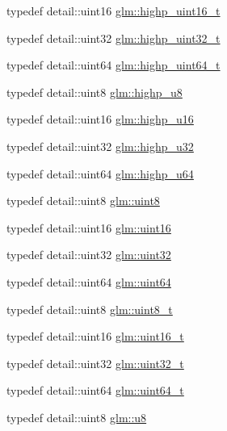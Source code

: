 \begin{DoxyCompactItemize}
\item 
typedef detail\-::uint16 \hyperlink{group__gtc__type__precision_ga3145bc0ee80432c165e985a188a722b3}{glm\-::highp\-\_\-uint16\-\_\-t}
\item 
typedef detail\-::uint32 \hyperlink{group__gtc__type__precision_ga8eb85ad460079c63b68866ae34637bda}{glm\-::highp\-\_\-uint32\-\_\-t}
\item 
typedef detail\-::uint64 \hyperlink{group__gtc__type__precision_ga6e66f40c5909bfc872b068187fa6029e}{glm\-::highp\-\_\-uint64\-\_\-t}
\item 
typedef detail\-::uint8 \hyperlink{group__gtc__type__precision_ga8a60abe782749c504fb5ae51eb8b49cc}{glm\-::highp\-\_\-u8}
\item 
typedef detail\-::uint16 \hyperlink{group__gtc__type__precision_ga9da2178d7501d9c0f225fa1a7b70cb45}{glm\-::highp\-\_\-u16}
\item 
typedef detail\-::uint32 \hyperlink{group__gtc__type__precision_gae8e8a2c712653891a03c171795286ac5}{glm\-::highp\-\_\-u32}
\item 
typedef detail\-::uint64 \hyperlink{group__gtc__type__precision_ga6006ea883d3c0491791650b2fb84de39}{glm\-::highp\-\_\-u64}
\item 
typedef detail\-::uint8 \hyperlink{group__gtc__type__precision_ga1a7dcd8aac97cc8020817c94049deff2}{glm\-::uint8}
\item 
typedef detail\-::uint16 \hyperlink{group__gtc__type__precision_gad8c2939e1fdd8e5828b31d95c52255d5}{glm\-::uint16}
\item 
typedef detail\-::uint32 \hyperlink{group__gtc__type__precision_ga202b6a53c105fcb7e531f9b443518451}{glm\-::uint32}
\item 
typedef detail\-::uint64 \hyperlink{group__gtc__type__precision_gae3632bf9b37da66233d78930dd06378a}{glm\-::uint64}
\item 
typedef detail\-::uint8 \hyperlink{group__gtc__type__precision_ga93adf6dd9803408f3e3aaf9dedda352b}{glm\-::uint8\-\_\-t}
\item 
typedef detail\-::uint16 \hyperlink{group__gtc__type__precision_gac4eb4f43cae8129b00086dc234d3b8fc}{glm\-::uint16\-\_\-t}
\item 
typedef detail\-::uint32 \hyperlink{group__gtc__type__precision_ga822ca53a9ad412504532838906276a99}{glm\-::uint32\-\_\-t}
\item 
typedef detail\-::uint64 \hyperlink{group__gtc__type__precision_ga058f57c19e1befdcf12498944bd73e69}{glm\-::uint64\-\_\-t}
\item 
typedef detail\-::uint8 \hyperlink{group__gtc__type__precision_ga5e3dc67373d5068997d2d9f41c9024d2}{glm\-::u8}

\end{DoxyCompactItemize}
